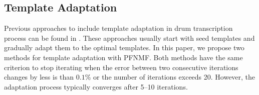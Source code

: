 \documentclass{article}
\begin{document}
\subsection{Template Adaptation}\label{subsec:templateAdapt}
Previous approaches to include template adaptation in drum transcription process can be found in \cite{yoshii_drum_2007,Dittmar2014}. These approaches usually start with seed templates and gradually adapt them to the optimal templates. In this paper, we propose two methods for template adaptation with PFNMF. 
Both methods have the same criterion to stop iterating when the error between two consecutive iterations changes by less is than $0.1\%$ or the number of iterations exceeds 20. However, the adaptation process typically converges after 5--10 iterations. 
\end{document}
